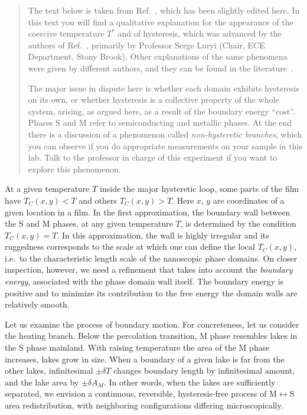 \documentclass[11pt,a4paper]{article}
\begin{document}
\begin{quote}\small
The text below is taken from Ref.~\cite{ref:gurvitch}, which has been slightly
edited here. In this text you will find a qualitative explanation for the
appearance of the coercive temperature $T^{*}$ and of hysteresis, which was
advanced by the authors of Ref.~\cite{ref:gurvitch}, primarily by Professor Serge
Luryi (Chair, ECE Department, Stony Brook). Other explanations of the same
phenomena were given by different authors, and they can be found in the
literature~\cite{ref:lanskaya}.

The major issue in dispute here is whether each domain exhibits hysteresis on its
own, or whether hysteresis is a collective property of the whole system, arising,
as argued here, as a result of the boundary energy ``cost''. Phases S and M refer
to semiconducting and metallic phases. At the end there is a discussion of a
phenomenon called \emph{non-hysteretic branches}, which you can observe if you do
appropriate measurements on your sample in this lab. Talk to the professor in
charge of this experiment if you want to explore this phenomenon.
\end{quote}

At a given temperature $T$ inside the major hysteretic loop, some parts of the film
have $T_C(x,y) < T$ and others $T_C(x,y) > T$. Here $x$, $y$ are coordinates of a
given location in a film. In the first approximation, the boundary wall between
the S and M phases, at any given temperature $T$, is determined by the condition
$T_C(x,y) = T$. In this approximation, the wall is highly irregular and its
ruggedness corresponds to the scale at which one can define the local $T_C(x,y)$,
i.e.\ to the characteristic length scale of the nanoscopic phase domains. On
closer inspection, however, we need a refinement that takes into account the
\emph{boundary energy}, associated with the phase domain wall itself. The boundary
energy is positive and to minimize its contribution to the free energy the domain
walls are relatively smooth.

Let us examine the process of boundary motion. For concreteness, let us consider
the heating branch. Below the percolation transition, M phase resembles lakes in
the S phase mainland. With raising temperature the area of the M phase increases,
lakes grow in size. When a boundary of a given lake is far from the other lakes,
infinitesimal $\pm\delta T$ changes boundary length by infinitesimal amount, and
the lake area by $\pm\delta A_M$. In other words, when
the lakes are sufficiently separated, we envision a continuous, reversible,
hysteresis-free process of $\mathrm{M}\leftrightarrow\mathrm{S}$ area
redistribution, with neighboring configurations differing microscopically.
\end{document}
